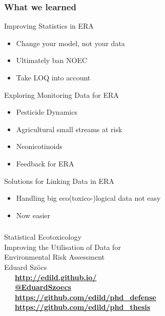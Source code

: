 \documentclass[10pt
	]{beamer}
\begin{document}
\begin{frame}
\frametitle{What we learned}
	\begin{exampleblock}{\checkmark Improving Statistics in ERA}
		\begin{itemize}
			\item Change your model, not your data
			\item Ultimately ban NOEC
			\item Take LOQ into account
		\end{itemize}
	\end{exampleblock}

\pause
	\begin{exampleblock}{\checkmark Exploring Monitoring Data for ERA}
		\begin{itemize}
			\item Pesticide Dynamics
			\item Agricultural small streams at risk
			\item Neonicotinoids
			\item Feedback for ERA
		\end{itemize}
	\end{exampleblock}

\pause
	\begin{exampleblock}{\checkmark Solutions for Linking Data in ERA}
		\begin{itemize}
			\item Handling big eco(toxico-)logical data not easy
			\item Now easier
		\end{itemize}
	\end{exampleblock}


\end{frame}


\begin{frame}[standout]
	\frametitle{}

	\vspace{1em}
	\Huge{Statistical Ecotoxicology} \\[0.3em]
	\large{Improving the Utilisation of Data for \\ Environmental Risk Assessment} \\[1em]

	\normalsize
	Eduard Szöcs \\[3em]

	\faLaptop~~~\textbf{\href{http://edild.github.io/}{http://edild.github.io/ }}\\[.5em]
	\faTwitter~~~\textbf{\href{http://twitter.com/EduardSzoecs}{@EduardSzoecs}} 	\\[0.5em]
	\faFilePowerpointO~~~\textbf{\href{https://github.com/edild/phd_defense}{https://github.com/edild/phd\_defense}}\\[0.5em]
	\faBook~~~\textbf{\href{https://github.com/edild/phd_thesis}{https://github.com/edild/phd\_thesis}}\\[3em]

	\begin{center}\ccbysa\end{center} 

\end{frame}
\end{document}
